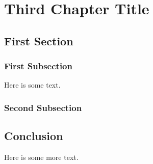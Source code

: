  \chapter{Third Chapter Title}


\section{First Section}
\subsection{First Subsection}
Here is some text. 

\subsection{Second Subsection}

\section{Conclusion}
Here is some more text. 